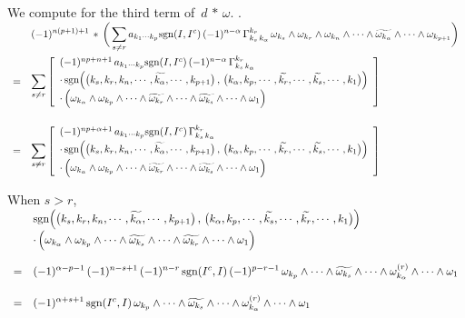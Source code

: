 \documentclass{article}[12pt,a4paper]
\begin{document}
We compute for the third term of \,$d\, \ast \,\omega$. .\\[0.1in]
$\begin{array}{rl}
&\displaystyle 
	(-1)^{n(p+1)+1}\,\ast\, \bigg( 
	\sum_{s\neq r} a_{k_1\cdots k_p} \mbox{sgn}(I, I^c)\, (-1)^{n-\alpha}\, \Gamma_{k_s\, k_\alpha}^{k_r} \,
 	\omega_{k_s} \wedge  \omega_{k_r} \wedge \omega_{k_n} \wedge\cdots\wedge \widetilde{\omega_{k_\alpha}} 
	\wedge\cdots\wedge \omega_{k_{p+1}}\bigg)\\[0.2in]
=& \displaystyle 
	\sum_{s\neq r} \left[\begin{array}{l}
	(-1)^{np+n+1}\, a_{k_1\cdots k_p} \mbox{sgn}(I, I^c)\, (-1)^{n-\alpha}\, \Gamma_{k_s\, k_\alpha}^{k_r} \\[2pt]
	\cdot \, \mbox{sgn}\Big(\big(k_s, k_r, k_n, \cdots, \widetilde{k_\alpha}, \cdots, k_{p+1}\big)\,,\,
	\big(k_\alpha, k_p, \cdots, \widetilde{k_r}, \cdots, \widetilde{k_s}, \cdots, k_1\big)\Big) \\[2pt]
	\cdot \, \Big(\omega_{k_\alpha} \wedge \omega_{k_p} \wedge\cdots\wedge \widetilde{\omega_{k_r}} \wedge\cdots\wedge \widetilde{\omega_{k_s}} 
	\wedge\cdots\wedge \omega_1 \Big)
	\end{array}\right] \\[0.5in]
=& \displaystyle 
	\sum_{s\neq r} \left[\begin{array}{l}
	(-1)^{np+\alpha+1}\, a_{k_1\cdots k_p} \mbox{sgn}(I, I^c)\, \Gamma_{k_s\, k_\alpha}^{k_r} \\[2pt]
	\cdot \,\mbox{sgn}\Big(\big(k_s, k_r, k_n, \cdots, \widetilde{k_\alpha}, \cdots, k_{p+1}\big)\,,\,
	\big(k_\alpha, k_p, \cdots, \widetilde{k_r}, \cdots, \widetilde{k_s}, \cdots, k_1\big)\Big) \\[2pt]
	\cdot \, \Big(\omega_{k_\alpha} \wedge \omega_{k_p} \wedge\cdots\wedge \widetilde{\omega_{k_r}} \wedge\cdots\wedge \widetilde{\omega_{k_s}} 
	\wedge\cdots\wedge \omega_1 \Big)
	\end{array} \right]
\end{array}$
\newpage 

When $s>r$, \\[0.1in]
$\begin{array}{rl} 
& \displaystyle  
	\mbox{sgn}\Big(\big(k_s, k_r, k_n, \cdots, \widetilde{k_\alpha}, \cdots, k_{p+1}\big)\,,\,
	\big(k_\alpha, k_p, \cdots, \widetilde{k_s}, \cdots, \widetilde{k_r}, \cdots, k_1\big)\Big)\\[4pt]
& \displaystyle 
	\cdot \, \Big(\omega_{k_\alpha} \wedge \omega_{k_p} \wedge\cdots\wedge \widetilde{\omega_{k_s}} 
	\wedge\cdots\wedge \widetilde{\omega_{k_r}} \wedge\cdots\wedge \omega_1\Big) \\[0.2in]
=& \displaystyle 
	(-1)^{\alpha-p-1} \, (-1)^{n-s+1}\, (-1)^{n-r}\, \mbox{sgn}(I^c, I)  \,
	(-1)^{p-r-1}\, \omega_{k_p} \wedge\cdots\wedge \widetilde{\omega_{k_s}} \wedge\cdots\wedge 
	\omega_{k_\alpha}^{(r)} \wedge\cdots\wedge \omega_1 \\[0.2in]
=& \displaystyle 
	(-1)^{\alpha+s+1} \, \mbox{sgn}(I^c, I)\, 
	\omega_{k_p} \wedge\cdots\wedge \widetilde{\omega_{k_s}} \wedge\cdots\wedge 
	\omega_{k_\alpha}^{(r)} \wedge\cdots\wedge \omega_1
\end{array}$ \\[0.1in]
\end{document}

